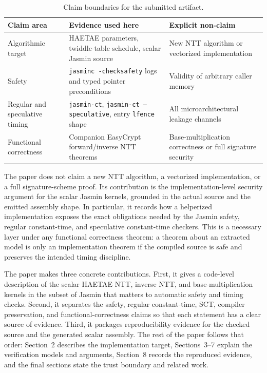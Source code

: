 \documentclass[10pt,twocolumn]{article}
\newcommand{\jasmin}{Jasmin}
\newcommand{\ct}{constant-time}
\begin{document}
\begin{table}[t]
\centering
\scriptsize
\setlength{\tabcolsep}{3pt}
\begin{tabular}{P{0.30\columnwidth}P{0.34\columnwidth}P{0.26\columnwidth}}
\toprule
Claim area & Evidence used here & Explicit non-claim \\
\midrule
Algorithmic target & HAETAE parameters, twiddle-table schedule, scalar
\jasmin{} source & New NTT algorithm or vectorized implementation \\
Safety & \texttt{jasminc -checksafety} logs and typed pointer preconditions &
Validity of arbitrary caller memory \\
Regular and speculative timing & \texttt{jasmin-ct}, \texttt{jasmin-ct
--speculative}, entry \texttt{lfence} shape & All microarchitectural leakage
channels \\
Functional correctness & Companion EasyCrypt forward/inverse NTT theorems &
Base-multiplication correctness or full signature security \\
\bottomrule
\end{tabular}
\caption{Claim boundaries for the submitted artifact.}
\label{tab:claim-boundaries}
\end{table}

The paper does not claim a new NTT algorithm, a vectorized implementation, or a
full signature-scheme proof.  Its contribution is the implementation-level
security argument for the scalar \jasmin{} kernels, grounded in the actual
source and the emitted assembly shape.  In particular, it records how a
helperized implementation exposes the exact obligations needed by the \jasmin{}
safety, regular \ct{}, and speculative \ct{} checkers.  This is a necessary
layer under any functional correctness theorem: a theorem about an extracted
model is only an implementation theorem if the compiled source is safe and
preserves the intended timing discipline.

The paper makes three concrete contributions.  First, it gives a code-level
description of the scalar HAETAE NTT, inverse NTT, and base-multiplication
kernels in the subset of \jasmin{} that matters to automatic safety and timing
checks.  Second, it separates the safety, regular \ct{}, SCT, compiler
preservation, and functional-correctness claims so that each statement has a
clear source of evidence.  Third, it packages reproducibility evidence for the
checked source and the generated scalar assembly.  The rest of the paper follows
that order: Section~2 describes the implementation target, Sections~3--7 explain
the verification models and arguments, Section~8 records the reproduced
evidence, and the final sections state the trust boundary and related work.
\end{document}
